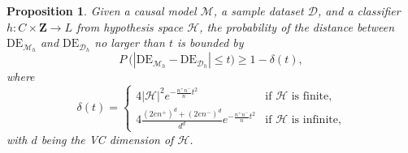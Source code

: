 \documentclass{article}
\newtheorem{proposition}{Proposition}
\begin{document}
\begin{proposition}\label{thm:mhdh}
Given a causal model $\mathcal{M}$, a sample dataset $\mathcal{D}$, and a classifier $h: C\times \mathbf{Z} \rightarrow L$ from hypothesis space $\mathcal{H}$, the probability of the distance between $\mathrm{DE}_{\mathcal{M}_{h}}$ and $\mathrm{DE}_{\mathcal{D}_{h}}$ no larger than $t$ is bounded by
\begin{equation*}
P~ \Bigg(  \left| \mathrm{DE}_{\mathcal{M}_{h}} - \mathrm{DE}_{\mathcal{D}_{h}} \right| \leq t \Bigg) \geq 1-\delta(t),
\end{equation*}
where
\begin{equation*}
\delta(t) = 
\begin{cases}
\displaystyle 4|\mathcal{H}|^{2} e^{-\frac{n^{+}n^{-}}{n}t^{2}} & \textrm{if $\mathcal{H}$ is finite,}\\
\displaystyle 4 \frac{(2en^{+})^{d}+(2en^{-})^{d}}{d^d} e^{-\frac{n^{+}n^{-}}{n}t^{2}} & \textrm{if $\mathcal{H}$ is infinite,}
\end{cases}
\end{equation*}
with $d$ being the VC dimension of $\mathcal{H}$.
\end{proposition}
\end{document}
